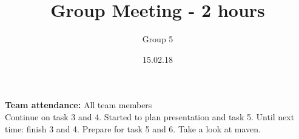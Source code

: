 \documentclass{article}
\title{Group Meeting - 2 hours}
\author{Group 5}
\date{15.02.18}
\begin{document}
	\maketitle
	\noindent
	\textbf{Team attendance:} All team members \\
	
	\noindent
	Continue on task 3 and 4. Started to plan presentation and task 5. 
	Until next time: finish 3 and 4. Prepare for task 5 and 6. 
	Take a look at maven.
\end{document}
